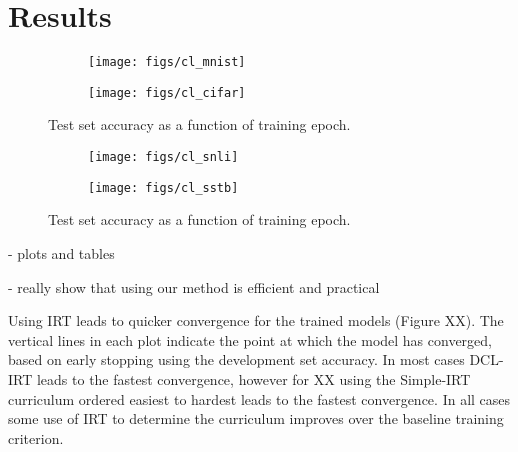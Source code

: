 \documentclass[letterpaper]{article} %
\begin{document}
\section{Results} 


\captionsetup[subfigure]{labelformat=empty}
\begin{figure*}[th!]
	\centering
	\begin{subfigure}[b]{0.45\textwidth}
		\centering
		\texttt{[image: figs/cl\_mnist]}
		\caption{\label{fig:cl_mnist}} 
		\vspace{-2em} 
	\end{subfigure} 
	\begin{subfigure}[b]{0.45\textwidth}
		\centering
		\texttt{[image: figs/cl\_cifar]}
		\caption{\label{fig:cl_cifar}} 
		\vspace{-2em} 
	\end{subfigure} 
	
	\caption{Test set accuracy as a function of training epoch.}
	\label{fig:acc_viz}
\end{figure*}

\captionsetup[subfigure]{labelformat=empty}
\begin{figure*}[th!]
	\centering
	\begin{subfigure}[b]{0.45\textwidth}
		\centering
		\texttt{[image: figs/cl\_snli]}
		\caption{\label{fig:cl_snli}} 
		\vspace{-2em} 
	\end{subfigure} 
	\begin{subfigure}[b]{0.45\textwidth}
		\centering
		\texttt{[image: figs/cl\_sstb]}
		\caption{\label{fig:cl_sstb}} 
		\vspace{-2em} 
	\end{subfigure} 
	
	\caption{Test set accuracy as a function of training epoch.}
	\label{fig:acc_nlp}
\end{figure*}

- plots and tables 

- really show that using our method is efficient and practical 

Using IRT leads to quicker convergence for the trained models (Figure XX).
The vertical lines in each plot indicate the point at which the model has converged, based on early stopping using the development set accuracy.
In most cases DCL-IRT leads to the fastest convergence, however for XX using the Simple-IRT curriculum ordered easiest to hardest leads to the fastest convergence.
In all cases some use of IRT to determine the curriculum improves over the baseline training criterion. 
\end{document}
